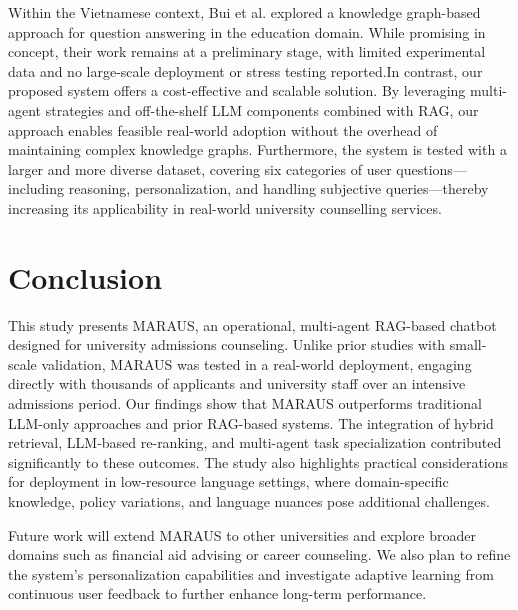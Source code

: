 \documentclass[runningheads]{llncs}
\begin{document}
Within the Vietnamese context, Bui et al. explored a knowledge graph-based approach for question answering in the education domain. While promising in concept, their work remains at a preliminary stage, with limited experimental data and no large-scale deployment or stress testing reported.In contrast, our proposed system offers a cost-effective and scalable solution. By leveraging multi-agent strategies and off-the-shelf LLM components combined with RAG, our approach enables feasible real-world adoption without the overhead of maintaining complex knowledge graphs. Furthermore, the system is tested with a larger and more diverse dataset, covering six categories of user questions—including reasoning, personalization, and handling subjective queries—thereby increasing its applicability in real-world university counselling services.

\section{Conclusion}
This study presents MARAUS, an operational, multi-agent RAG-based chatbot designed for university admissions counseling. Unlike prior studies with small-scale validation, MARAUS was tested in a real-world deployment, engaging directly with thousands of applicants and university staff over an intensive admissions period. Our findings show that MARAUS outperforms traditional LLM-only approaches and prior RAG-based systems. The integration of hybrid retrieval, LLM-based re-ranking, and multi-agent task specialization contributed significantly to these outcomes. The study also highlights practical considerations for deployment in low-resource language settings, where domain-specific knowledge, policy variations, and language nuances pose additional challenges. 

Future work will extend MARAUS to other universities and explore broader domains such as financial aid advising or career counseling. We also plan to refine the system’s personalization capabilities and investigate adaptive learning from continuous user feedback to further enhance long-term performance.





\end{document}
